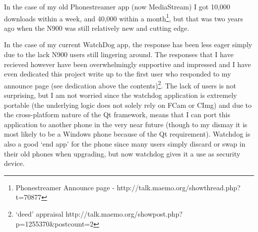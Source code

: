 In the case of my old Phonestreamer app (now MediaStream) I got 10,000 downloads within a week, and 40,000 within a month\footnote{Phonestreamer Announce page - http://talk.maemo.org/showthread.php?t=70877}, but that was two years ago when the N900 was still relatively new and cutting edge.

In the case of my current WatchDog app, the response has been less eager simply due to the lack N900 users still lingering around. The responses that I have recieved however have been overwhelmingly supportive and impressed and I have even dedicated this project write up to the first user who responded to my announce page (see dedication above the contents)\footnote{‘deed’ appraisal http://talk.maemo.org/showpost.php?p=1255370\&postcount=2}. The lack of users is not surprising, but I am not worried since the watchdog application is extremely portable (the underlying logic does not solely rely on FCam or CImg) and due to the cross-platform nature of the Qt framework, means that I can port this application to another phone in the very near future (though to my dismay it is most likely to be a Windows phone because of the Qt requirement). Watchdog is also a good ‘end app’ for the phone since many users simply discard or swap in their old phones when upgrading, but now watchdog gives it a use as security device.
